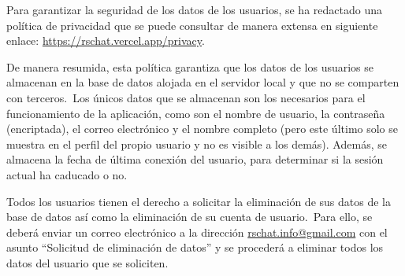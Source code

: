
Para garantizar la seguridad de los datos de los usuarios, se ha redactado una política de privacidad
que se puede consultar de manera extensa en siguiente enlace:
\href{https://rschat.vercel.app/privacy}{https://rschat.vercel.app/privacy}.

De manera resumida, esta política garantiza que los datos de los usuarios se almacenan en la base de datos alojada en el
servidor local y que no se comparten con terceros.\ Los únicos datos que se almacenan son los necesarios para el
funcionamiento de la aplicación, como son el nombre de usuario, la contraseña (encriptada), el correo electrónico y
el nombre completo (pero este último solo se muestra en el perfil del propio usuario y no es visible a los demás).
Además, se almacena la fecha de última conexión del usuario, para determinar si la sesión actual ha caducado o no.

Todos los usuarios tienen el derecho a solicitar la eliminación de sus datos de la base de datos así como
la eliminación de su cuenta de usuario.\ Para ello, se deberá enviar un correo electrónico a la dirección
\href{mailto:rschat.info@gmail.com}{rschat.info@gmail.com} con el asunto ``Solicitud de eliminación de datos'' y se
procederá a eliminar todos los datos del usuario que se soliciten.

